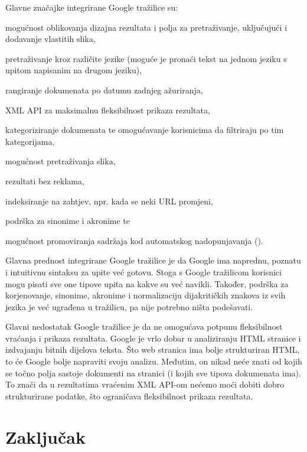 \documentclass[a4paper,twoside,12pt]{scrreprt}
\begin{document}
Glavne značajke integrirane Google tražilice su:

\begin{compactitem}
  \item mogućnost oblikovanja dizajna rezultata i polja za pretraživanje, uključujući i dodavanje vlastitih slika,
  \item pretraživanje kroz različite jezike (moguće je pronaći tekst na jednom jeziku s upitom napisanim na drugom jeziku),
  \item rangiranje dokumenata po datumu zadnjeg ažuriranja,
  \item XML API za maksimalnu fleksibilnost prikaza rezultata,
  \item kategoriziranje dokumenata te omogućavanje korisnicima da filtriraju po tim kategorijama,
  \item mogućnost pretraživanja slika,
  \item rezultati bez reklama,
  \item indeksiranje na zahtjev, npr. kada se neki URL promjeni,
  \item podrška za sinonime i akronime te
  \item mogućnost promoviranja sadržaja kod automatskog nadopunjavanja (\cite{google}).
\end{compactitem}

Glavna prednost integrirane Google tražilice je da Google ima naprednu, poznatu i intuitivnu sintaksu za upite već gotovu. Stoga s Google tražilicom korisnici mogu pisati sve one tipove upita na kakve su već navikli. Također, podrška za korjenovanje, sinonime, akronime i normalizaciju dijakritičkih znakova iz svih jezika je već ugrađena u tražilicu, pa nije potrebno ništa podešavati.

Glavni nedostatak Google tražilice je da ne omogućava potpunu fleksibilnost vraćanja i prikaza rezultata. Google je vrlo dobar u analiziranju HTML stranice i izdvajanju bitnih dijelova teksta. Što web stranica ima bolje strukturiran HTML, to će Google bolje napraviti svoju analizu. Međutim, on nikad neće znati od kojih se točno polja sastoje dokumenti na stranici (i kojih sve tipova dokumenata ima). To znači da u rezultatima vraćenim XML API-om nećemo moći dobiti dobro strukturirane podatke, što ograničava fleksibilnost prikaza rezultata.

\chapter{Zaključak}
\end{document}
